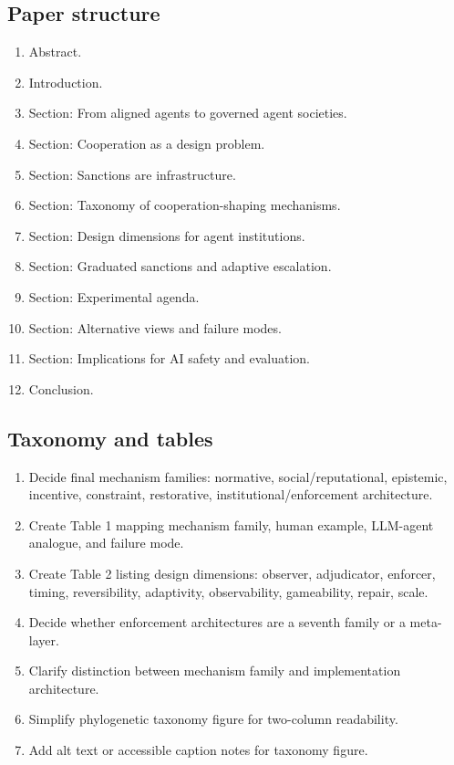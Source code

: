 \subsection*{Paper structure}
\begin{enumerate}
  \item[$\square$] Abstract.
  \item[$\square$] Introduction.
  \item[$\square$] Section: From aligned agents to governed agent societies.
  \item[$\square$] Section: Cooperation as a design problem.
  \item[$\square$] Section: Sanctions are infrastructure.
  \item[$\square$] Section: Taxonomy of cooperation-shaping mechanisms.
  \item[$\square$] Section: Design dimensions for agent institutions.
  \item[$\square$] Section: Graduated sanctions and adaptive escalation.
  \item[$\square$] Section: Experimental agenda.
  \item[$\square$] Section: Alternative views and failure modes.
  \item[$\square$] Section: Implications for AI safety and evaluation.
  \item[$\square$] Conclusion.
\end{enumerate}

\subsection*{Taxonomy and tables}
\begin{enumerate}
  \item[$\square$] Decide final mechanism families: normative, social/reputational, epistemic, incentive, constraint, restorative, institutional/enforcement architecture.
  \item[$\square$] Create Table 1 mapping mechanism family, human example, LLM-agent analogue, and failure mode.
  \item[$\square$] Create Table 2 listing design dimensions: observer, adjudicator, enforcer, timing, reversibility, adaptivity, observability, gameability, repair, scale.
  \item[$\square$] Decide whether enforcement architectures are a seventh family or a meta-layer.
  \item[$\square$] Clarify distinction between mechanism family and implementation architecture.
  \item[$\square$] Simplify phylogenetic taxonomy figure for two-column readability.
  \item[$\square$] Add alt text or accessible caption notes for taxonomy figure.
\end{enumerate}

